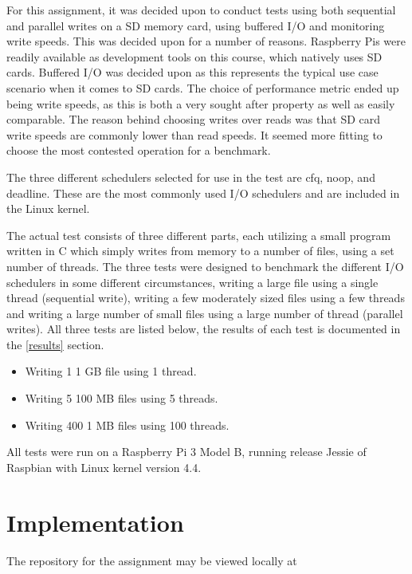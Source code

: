 \documentclass[10pt, titlepage, oneside, a4paper]{article}
\begin{document}
        For this assignment, it was decided upon to conduct tests using both sequential and parallel writes on a SD memory card, using buffered I/O and monitoring write speeds. This was decided upon for a number of reasons. Raspberry Pis were readily available as development tools on this course, which natively uses SD cards. Buffered I/O was decided upon as this represents the typical use case scenario when it comes to SD cards. The choice of performance metric ended up being write speeds, as this is both a very sought after property as well as easily comparable. The reason behind choosing writes over reads was that SD card write speeds are commonly lower than read speeds. It seemed more fitting to choose the most contested operation for a benchmark.
        
        The three different schedulers selected for use in the test are cfq, noop, and deadline. These are the most commonly used I/O schedulers and are included in the Linux kernel.
        
        The actual test consists of three different parts, each utilizing a small program written in C which simply writes from memory to a number of files, using a set number of threads. The three tests were designed to benchmark the different I/O schedulers in some different circumstances, writing a large file using a single thread (sequential write), writing a few moderately sized files using a few threads and writing a large number of small files using a large number of thread (parallel writes). All three tests are listed below, the results of each test is documented in the \ref{results} section.
        
        \begin{itemize}
            \item Writing 1 1 GB file using 1 thread. 
            \item Writing 5 100 MB files using 5 threads.
            \item Writing 400 1 MB files using 100 threads.
        \end{itemize}
        
        All tests were run on a Raspberry Pi 3 Model B, running release Jessie of Raspbian with Linux kernel version 4.4.

    \section{Implementation}
       
        The repository for the assignment may be viewed locally at
        
\end{document}
